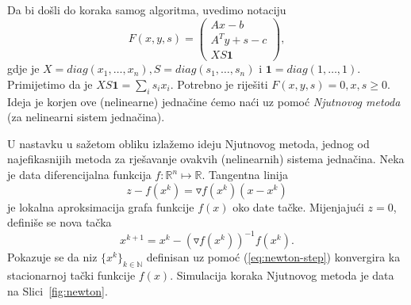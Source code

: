 \documentclass[a4paper, utf8, 11pt, colorlinks]{book}
\begin{document}
Da bi došli do koraka samog algoritma, uvedimo notaciju 
$$ F(x, y, s) = \left (\begin{array}{c}
	Ax - b           \\
	A^T y + s - c     \\
	X S \textbf{1}                   
\end{array} \right ),$$
gdje je  $X = diag (x_1, \ldots, x_n ), S = diag(s_1,\ldots, s_n)$ i 
$\textbf{1} = diag (1,\ldots, 1)$. Primijetimo da  je $X S \textbf{1}=\sum_{i} s_i x_i$. 
Potrebno je riješiti $F(x, y, s ) = 0, x,s \geq 0$. Ideja je korjen ove (nelinearne) jednačine ćemo naći uz pomoć \emph{Njutnovog metoda} (za nelinearni sistem jednačina).  %

U nastavku u sažetom obliku izlažemo ideju Njutnovog metoda, jednog od najefikasnijih metoda za rješavanje ovakvih (nelinearnih) sistema jednačina. Neka je data diferencijalna funkcija $f: \mathbb{R}^n \mapsto \mathbb{R}$.   Tangentna linija 
$$z - f(x^k) = \triangledown f(x^k) (x - x^k) $$
je lokalna aproksimacija grafa funkcije $f(x)$ oko date tačke. Mijenjajući $z=0$, definiše se nova tačka 
\begin{equation} \label{eq:newton-step}
	x^{k+1} = x^k - (\triangledown f(x^k))^{-1} f(x^k).
\end{equation}
Pokazuje se da niz $\{x^k\}_{k \in \mathbb{N}}$ definisan uz pomoć (\ref{eq:newton-step}) konvergira ka stacionarnoj tački funkcije $f(x)$. Simulacija koraka Njutnovog metoda je data na Slici~\ref{fig:newton}. 
\end{document}
